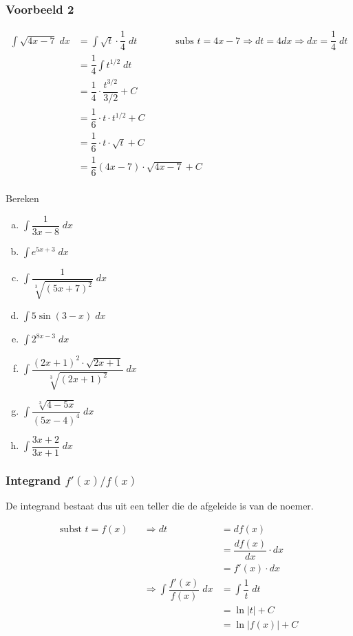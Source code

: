 \documentclass[a4paper,12pt, twoside]{article}
\begin{document}
\subsubsection*{Voorbeeld 2}
\begin{align*}
  \int \sqrt{4x-7} \;dx
  &= \int \sqrt{t} \cdot \dfrac{1}{4} \;dt \qquad\qquad\mbox{subs }t=4x-7 \Rightarrow dt = 4dx \Rightarrow dx = \dfrac{1}{4} \;dt\\
  &= \dfrac{1}{4} \int t^{1/2} \;dt\\
  &= \dfrac{1}{4} \cdot \dfrac{t^{3/2}}{3/2} + C\\
  &= \dfrac{1}{6} \cdot t\cdot t^{1/2} + C\\
  &= \dfrac{1}{6} \cdot t\cdot \sqrt{t} + C\\
  &= \dfrac{1}{6} (4x-7)\cdot \sqrt{4x-7} + C\\
\end{align*}

\begin{oefening}
  Bereken
  \begin{multicols}{2}
  \begin{enumerate}[(a)]
  \item $\displaystyle\int \dfrac{1}{3x-8} \;dx$
  \item $\displaystyle\int e^{5x+3} \;dx$
  \item $\displaystyle\int \dfrac{1}{\sqrt[3]{(5x+7)^2}} \;dx$
  \item $\displaystyle\int 5\sin(3-x) \;dx$
  \item $\displaystyle\int 2^{8x-3} \;dx$
  \item $\displaystyle\int \dfrac{(2x+1)^2 \cdot \sqrt{2x+1}}{\sqrt[3]{(2x+1)^2}} \;dx$
  \item $\displaystyle\int \dfrac{\sqrt[3]{4-5x}}{(5x-4)^4} \;dx$
  \item $\displaystyle\int \dfrac{3x+2}{3x+1} \;dx$
  \end{enumerate}
\end{multicols}
\end{oefening}

\pagebreak
\subsubsection{Integrand $f'(x)/f(x)$}

De integrand bestaat dus uit een teller die de afgeleide is van de noemer.

\begin{alignat*}{2}
  \mbox{subst } t = f(x) &&\Rightarrow dt &= df(x)\\
  &&               &= \dfrac{df(x)}{dx} \cdot dx \\
  &&               &= f'(x) \cdot dx\\
  &&\Rightarrow \int \dfrac{f'(x)}{f(x)} \;dx &= \int \dfrac{1}{t} \;dt\\
  &&                                          &= \ln |t| + C\\
  &&                                          &= \ln |f(x)| + C
\end{alignat*}
\end{document}

